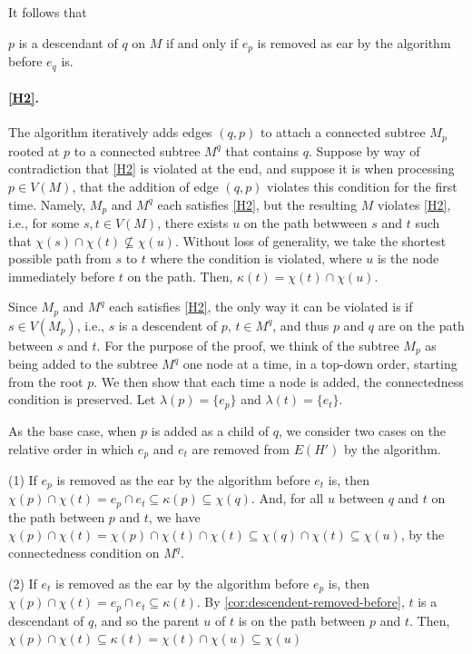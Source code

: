 It follows that

\begin{corollary} \label{cor:descendent-removed-before}
    $p$ is a descendant of $q$ on $M$ if and only if $e_p$ is removed as ear by the algorithm before $e_q$ is.
\end{corollary}

\paragraph{\ref{H2}.} 
The algorithm iteratively adds edges $(q, p)$ to attach a connected subtree $M_p$ rooted at $p$ to a connected subtree $M^q$ that contains $q$.
Suppose by way of contradiction that \ref{H2} is violated at the end, and
suppose it is when processing $p \in V(M)$, that the addition of edge $(q, p)$ violates this condition for the first time.
Namely, $M_p$ and $M^q$ each satisfies \ref{H2}, but the resulting $M$ violates \ref{H2}, i.e., for some $s, t \in V(M)$, there exists $u$ on the path betwween $s$ and $t$ such that $\chi(s) \cap \chi(t) \not\subseteq \chi(u)$.
Without loss of generality, we take the shortest possible path from $s$ to $t$ where the condition is violated, where $u$ is the node immediately before $t$ on the path. Then, $\kappa(t) = \chi(t) \cap \chi(u)$.

Since $M_p$ and $M^q$ each satisfies \ref{H2}, the only way it can be violated is if $s \in V(M_p)$, i.e., $s$ is a descendent of $p$, $t \in M^q$, and thus $p$ and $q$ are on the path between $s$ and $t$.
For the purpose of the proof, we think of the subtree $M_p$ as being added to the subtree $M^q$ one node at a time, in a top-down order, starting from the root $p$. We then show that each time a node is added, the connectedness condition is preserved.
Let $\lambda(p) = \{ e_p \}$ and $\lambda(t) = \{ e_t \}$.

As the base case, when $p$ is added as a child of $q$, we consider two cases on the relative order in which $e_p$ and $e_t$ are removed from $E(H')$ by the algorithm.

(1) If $e_p$ is removed as the ear by the algorithm before $e_t$ is, then $\chi(p) \cap \chi(t) = e_p \cap e_t \subseteq \kappa(p) \subseteq \chi(q)$. And, for all $u$ between $q$ and $t$ on the path between $p$ and $t$, we have $\chi(p) \cap \chi(t) = \chi(p) \cap \chi(t) \cap \chi(t) \subseteq \chi(q) \cap \chi(t) \subseteq \chi(u)$, by the connectedness condition on $M^q$.

(2) If $e_t$ is removed as the ear by the algorithm before $e_p$ is, then $\chi(p) \cap \chi(t) = e_p \cap e_t \subseteq \kappa(t)$.
By \cref{cor:descendent-removed-before}, $t$ is a descendant of $q$, and so the parent $u$ of $t$ is on the path between $p$ and $t$.
Then, $\chi(p) \cap \chi(t) \subseteq \kappa(t) = \chi(t) \cap \chi(u) \subseteq \chi(u)$


